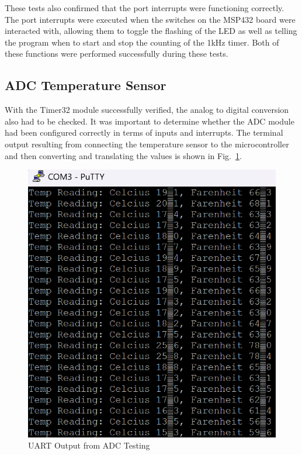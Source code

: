 \documentclass[conference]{IEEEtran}
\begin{document}
These tests also confirmed that the port interrupts were functioning
correctly. The port interrupts were executed when the switches on the
MSP432 board were interacted with, allowing them to toggle the flashing
of the LED as well as telling the program when to start and stop the
counting of the 1kHz timer. Both of these functions were performed
successfully during these tests.


\subsection{ADC Temperature Sensor}

With the Timer32 module successfully verified, the analog to digital 
conversion also had to be checked. It was important to
determine whether the ADC module had been configured correctly in terms of
inputs and interrupts. The terminal output resulting from connecting the
temperature sensor to the microcontroller and then converting and translating
the values is shown in Fig.~\ref{part2terminal}.

\begin{figure}
    \centering
    \includegraphics[width=\linewidth,decodearray={1 0 1 0 1 0}]{images/part2terminal2.png}
    \caption{UART Output from ADC Testing}
    \label{part2terminal}
\end{figure}
\end{document}
